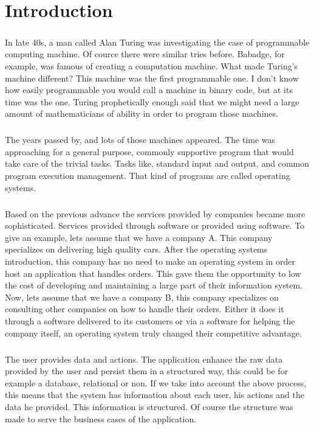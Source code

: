 \chapter{Introduction}

\paragraph{} In late 40s, a man called Alan Turing was investigating the case of programmable computing machine. Of cource there were similar tries before. Babadge, for example, was famous of creating a computation machine. What made Turing's machine different? This machine was the first programmable one. I don't know how easily programmable you would call a machine in binary code, but at its time was the one. Turing prophetically enough said that we might need a large amount of mathematicians of ability in order to program those machines.

\paragraph{} The years passed by, and lots of those machines appeared. The time was approaching for a general purpose, commonly supportive program that would take care of the trivial tasks. Tasks like, standard input and output, and common program execution management. That kind of programs are called operating systems.

\paragraph{} Based on the previous advance the services provided by companies became more sophisticated. Services provided through software or provided using software. To give an example, lets assume that we have a company A. This company specializes on delivering high quality cars. After the operating systems introduction, this company has no need to make an operating system in order host an application that handles orders. This gave them the opportunity to low the cost of developing and maintaining a large part of their information system. Now, lets assume that we have a company B, this company specializes on consulting other companies on how to handle their orders. Either it does it through a software delivered to its customers or via a software for helping the company itself, an operating system truly changed their competitive advantage.

\paragraph{} The user provides data and actions. The application enhance the raw data provided by the user and persist them in a structured way, this could be for example a database, relational or non. If we take into account the above process, this means that the system has information about each user, his actions and the data he provided. This information is structured. Of course the structure was made to serve the business cases of the application.

